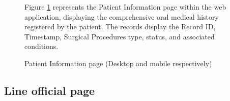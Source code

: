 \documentclass[12pt,oneside,openright,a4paper]{cpe-english-project}
\begin{document}
\begin{figure}[H]
\begin{minipage}{.25\textwidth}
      \end{minipage}
      \caption{Patient Information page (Desktop and mobile respectively)}\label{fig:Patient_Information_page}
      \begin{justify}
        \qquad Figure \ref{fig:Patient_Information_page} represents the Patient Information page within the web application, displaying the comprehensive oral medical history registered by the patient. The records display the Record ID, Timestamp, Surgical Procedures type, status, and associated conditions. \par
      \end{justify}
    \end{figure}
    \subsection{Line official page}
\end{document}
